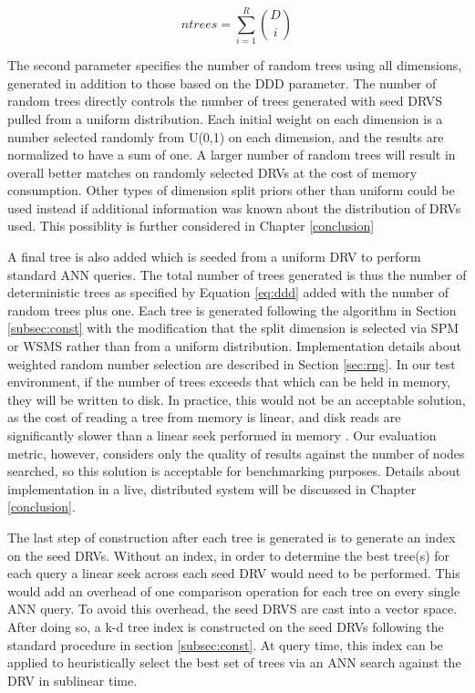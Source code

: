 \begin{equation}
\label{eq:ddd}
ntrees = \sum\limits_{i=1}^R {D \choose i}
\end{equation}

The second parameter specifies the number of random trees using all dimensions, generated in addition to those based on the DDD parameter.  The number of random trees directly controls the number of trees generated with seed DRVS pulled from a uniform distribution.  Each initial weight on each dimension is a number selected randomly from U(0,1) on each dimension, and the results are normalized to have a sum of one.  A larger number of random trees will result in overall better matches on randomly selected DRVs at the cost of memory consumption.  Other types of dimension split priors other than uniform could be used instead if additional information was known about the distribution of DRVs used.  This possiblity is further considered in Chapter \ref{conclusion}

A final tree is also added which is seeded from a uniform DRV to perform standard ANN queries.  The total number of trees generated is thus the number of deterministic trees as specified by Equation \ref{eq:ddd} added with the number of random trees plus one.  Each tree is generated following the algorithm in Section \ref{subsec:const} with the modification that the split dimension is selected via SPM or WSMS rather than from a uniform distribution.  Implementation details about weighted random number selection are described in Section \ref{sec:rng}.  In our test environment, if the number of trees exceeds that which can be held in memory, they will be written to disk.  In practice, this would not be an acceptable solution, as the cost of reading a tree from memory is linear, and disk reads are significantly slower than a linear seek performed in memory \citep{ousterhout1989beating}.  Our evaluation metric, however, considers only the quality of results against the number of nodes searched, so this solution is acceptable for benchmarking purposes.  Details about implementation in a live, distributed system will be discussed in Chapter \ref{conclusion}.

The last step of construction after each tree is generated is to generate an index on the seed DRVs.  Without an index, in order to determine the best tree(s) for each query a linear seek across each seed DRV would need to be performed.  This would add an overhead of one comparison operation for each tree on every single ANN query.  To avoid this overhead, the seed DRVS are cast into a vector space.  After doing so, a k-d tree index is constructed on the seed DRVs following the standard procedure in section \ref{subsec:const}.  At query time, this index can be applied to heuristically select the best set of trees via an ANN search against the DRV in sublinear time.

